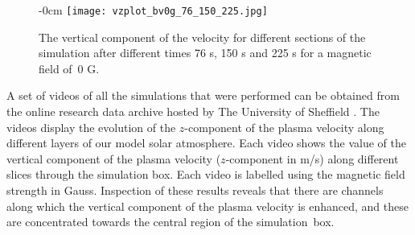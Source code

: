 \documentclass[physics,article,accept,pdftex,moreauthors]{Definitions/mdpi}
\begin{document}
\begin{figure}[H]
\begin{adjustwidth}{-\extralength}{0cm}
\centering %
\texttt{[image: vzplot\_bv0g\_76\_150\_225.jpg]}
\end{adjustwidth}
\caption{{The vertical} %
 component of the velocity for different sections of the simulation after different times 76 s, 150 s and 225 s for a magnetic field of~0 G.\label{fig6}}
\end{figure}


A set of videos of all the simulations that were performed can be obtained from the online research data archive hosted by 
The University of 
Sheffield %
 {\cite{Griffiths2018a}}. %
 The videos display the evolution of the $z$-component of the plasma velocity along different layers of our model solar atmosphere. Each video shows the value of the vertical component of the plasma velocity ($z$-component in m/s) along different slices through the simulation box. Each video is labelled using the magnetic field strength in Gauss. Inspection of these results reveals that there are channels along which the vertical component of the plasma velocity is enhanced, and these are concentrated towards the central region of the simulation~box.



 
  
\end{document}

